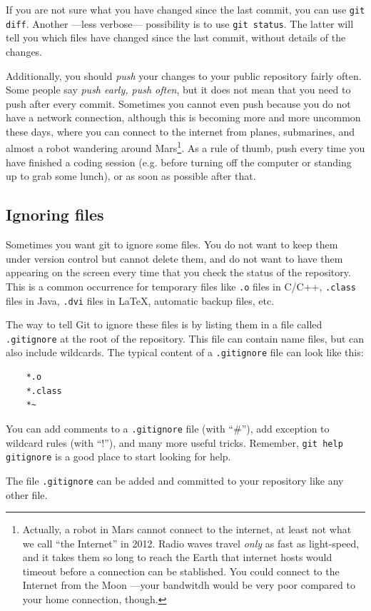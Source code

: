 If you are not sure what you have changed since the last commit, 
you can use \verb+git diff+. Another ---less verbose--- possibility
is to use \verb+git status+. The latter will tell you
which files have changed since the last commit, without details of the
changes.

Additionally, you should \emph{push} your changes to your public
repository fairly often. Some people say \emph{push early, push
  often}, but it does not mean that you need to push after every
commit. Sometimes 
you cannot even push because you do not have a network connection,
although this is becoming more and more uncommon these days, where you
can connect to the internet from planes, submarines, and almost a
robot wandering around Mars\footnote{Actually, a robot in Mars cannot
  connect to the internet, at least not what we call ``the Internet'' in
  2012. Radio waves travel \emph{only} as fast as light-speed, and it
  takes them so long to reach the Earth that internet hosts would
  timeout before a connection can be stablished. You could connect to
  the Internet from the Moon ---your bandwitdh would be
  very poor compared to your home connection, though.}. 
As a rule of thumb, push every time you 
have finished a coding session (e.g. before turning off the computer
or standing up to grab some lunch), or as soon as possible after that.


\subsection{Ignoring files}
\label{sec:ignoring-files}

Sometimes you want git to ignore some files. You do not want to keep
them under version control but cannot delete them, and do not want to
have them appearing on the screen every time that you check the status
of the repository. This is a common occurrence for temporary files
like \verb+.o+ files in C/C++, \verb+.class+ files in Java,
\verb+.dvi+ files in \LaTeX, automatic backup files, etc.

The way to tell Git to ignore these files is by listing them in a file
called \verb+.gitignore+ at the root of the repository. This file can
contain name files, but can also include wildcards. The typical
content of a \verb+.gitignore+ file can look like this:

\begin{verbatim}
    *.o
    *.class
    *~
\end{verbatim}

You can add comments to a \verb+.gitignore+ file (with ``\#''), add
exception to wildcard rules (with ``!''), and many more useful
tricks. Remember, \verb+git help gitignore+ is a good place to start
looking for help. 

The file \verb+.gitignore+ can be added and committed to your
repository like any other file.





